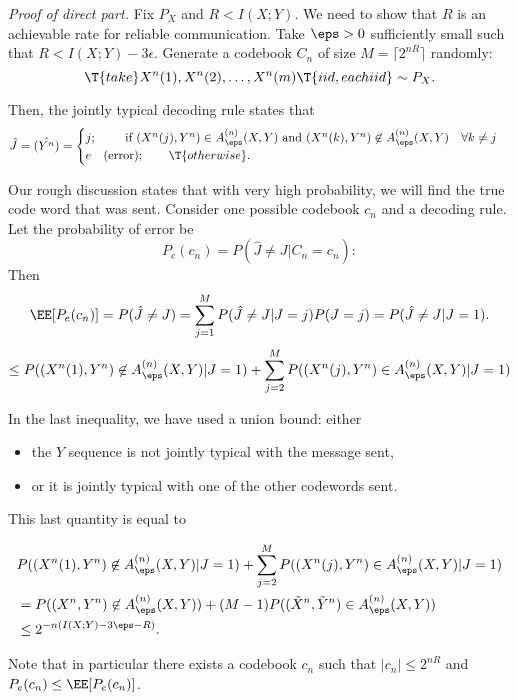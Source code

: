 {\it Proof of direct part.}  Fix $P_X$ and $R < I(X; Y)$.  We need to show that $R$ is an achievable rate for reliable communication.  Take $\eps > 0$ sufficiently small such that $R < I(X; Y) - 3 \epsilon$.  Generate a codebook $C_n$ of size $M = \lceil2^{nR} \rceil$ randomly:
\[
  \T{take } X^n(1), X^n(2), \dots, X^n(m) \T{ iid, each iid} \sim P_X.
\]

Then, the jointly typical decoding rule states that
\[
  \hat{J} = \hat{(Y^n)} =
  \begin{cases}
    j; \qquad \text{ if } (X^n(j), Y^n) \in A_{\eps}^{(n)} (X, Y) \text{ and } (X^{n}(k), Y^{n}) \not \in A_{\eps}^{(n)}(X, Y) \quad \forall k \neq j \\
    e \quad (\text{error}); \qquad \T{otherwise}.
    \end{cases}
\]

Our rough discussion states that with very high probability, we will find the true code word that was sent.  Consider one possible codebook $c_n$ and a decoding rule.  Let the probability of error be 
\[
  P_e(c_n)  = P(\hat{J} \neq J | C_n = c_n): 
\]
Then
\[
  \EE [P_e(c_n)] = P(\hat{J} \neq J) = \sum_{j=1}^{M} P(\hat{J} \neq J | J = j) P(J = j) = P(\hat{J} \neq J | J = 1).
\]
\[
\leq P((X^n (1), Y^n) \not \in A_{\eps}^{(n)} (X, Y) | J = 1) + \sum_{j=2}^{M} P((X^n(j), Y^n) \in A_{\eps}^{(n)} (X, Y) | J = 1)
\]

In the last inequality, we have used a union bound: either 

\begin{itemize}
  \item  the $Y$ sequence is not jointly typical with the message sent, 
  \item or it is jointly typical with one of the other codewords sent.
\end{itemize}

This last quantity is equal to

\begin{align*}
  &  P((X^n (1), Y^n) \not \in A_{\eps}^{(n)} (X, Y) | J = 1) + \sum_{j=2}^{M} P((X^n(j), Y^n) \in A_{\eps}^{(n)} (X, Y) | J = 1) \\
    &= P ( (X^n, Y^n) \not \in A_{\eps}^{(n)} (X, Y)) + (M-1)P ((\Xt^n, \Yt^n) \in A_{\eps}^{(n)} (X, Y)) \\
    & \leq 2^{-n (I(X; Y) - 3 \eps - R)}.
\end{align*}

Note that in particular there exists a codebook $c_n$ such that $|c_n| \leq 2^{nR}$ and $P_e(c_n) \leq \EE [P_e(c_n)]$.

